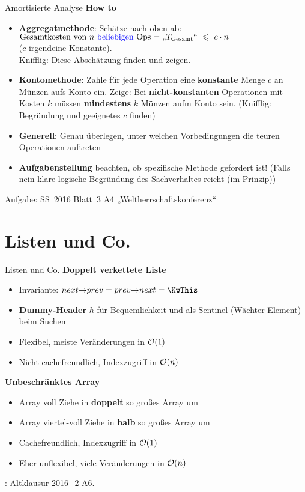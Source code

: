 \begin{frame}{Amortisierte Analyse}
	\textbf{How to} \\
	\begin{itemize}
		\item \textbf{Aggregatmethode}: Schätze nach oben ab: \\
		\qquad $
		\text{Gesamtkosten von $n$ \textcolor{blue}{beliebigen} Ops} = \text{„}T_\text{Gesamt}\text{“} \ \leq \ c \cdot n 
		$ \\
		($c$ irgendeine Konstante). \\ 
		Knifflig: Diese Abschätzung finden und zeigen. 
		\item \textbf{Kontomethode}: Zahle für jede Operation eine \textbf{konstante} Menge $c$ an Münzen aufs Konto ein. Zeige: Bei \textbf{nicht-konstanten} Operationen mit Kosten $k$ müssen \textbf{mindestens} $k$ Münzen aufm Konto sein.
		(Knifflig: Begründung und geeignetes $c$ finden)
		\item \textbf{Generell}: Genau überlegen, unter welchen Vorbedingungen die teuren Operationen auftreten
		\item \textbf{Aufgabenstellung} beachten, ob spezifische Methode gefordert ist! (Falls nein \impl klare logische Begründung des Sachverhaltes reicht (im Prinzip))
	\end{itemize}
	{\small Aufgabe: SS~2016 Blatt~3 A4 „Weltherrschaftskonferenz“}
\end{frame}


\section{Listen und Co.}

\begin{frame}{Listen und Co.}
	\textbf{Doppelt verkettete Liste}
	\begin{itemize}
		\item Invariante: $next \access prev = prev \access next = \KwThis$
		\item \textbf{Dummy-Header} $h$ für Bequemlichkeit und als Sentinel (Wächter-Element) beim Suchen
		\item[\Pros] Flexibel, meiste Veränderungen in $\mathcal{O}\!\left(1\right)$
		\item[\Cons] Nicht cachefreundlich, Indexzugriff in $\mathcal{O}\!\left(n\right)$
	\end{itemize}
	\textbf{Unbeschränktes Array} 
	\begin{itemize}
		\item Array voll \impl Ziehe in \textbf{doppelt} so großes Array um
		\item Array viertel-voll 
		\impl Ziehe in \textbf{halb} so großes Array um
		\item[\Pros] Cachefreundlich, Indexzugriff in $\mathcal{O}\!\left(1\right)$
		\item[\Cons] Eher unflexibel, viele Veränderungen in $\mathcal{O}\!\left(n\right)$
	\end{itemize}
	\medskip
	\small \ZB: Altklausur 2016\_2 A6.
\end{frame}

